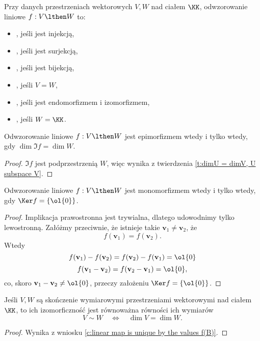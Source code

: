 \begin{definition}
    Przy danych przestrzeniach wektorowych $V, W$ nad ciałem $\KK$, odwzorowanie liniowe $f : V \lthen W$ to:
    \begin{itemize}
        \item {}, jeśli jest injekcją,
        \item {}, jeśli jest surjekcją,
        \item {}, jeśli jest bijekcją,
        \item {}, jeśli $V = W$,
        \item {}, jeśli jest endomorfizmem i izomorfizmem,
        \item {}, jeśli $W = \KK$.
    \end{itemize}
\end{definition}

\begin{theorem}
    Odwzorowanie liniowe $f : V \lthen W$ jest epimorfizmem wtedy i tylko wtedy, gdy $\dim\Im f = \dim W$.
\end{theorem}
\begin{proof}
    $\Im f$ jest podprzestrzenią $W$, więc wynika z twierdzenia \ref{t:dimU = dimV, U subspace V}.
\end{proof}

\begin{theorem}
    Odwzorowanie liniowe $f : V \lthen W$ jest monomorfizmem wtedy i tylko wtedy, gdy $\Ker f = \{\ol{0}\}$.
\end{theorem}
\begin{proof}
    Implikacja prawostronna jest trywialna, dlatego udowodnimy tylko lewostronną. Załóżmy przeciwnie, że istnieje takie $\mathbf{v}_1 \neq \mathbf{v}_2$, że
    \[ f(\mathbf{v}_1) = f(\mathbf{v}_2). \]
    Wtedy
    \[ f(\mathbf{v}_1) - f(\mathbf{v}_2) = f(\mathbf{v}_2) - f(\mathbf{v}_1) = \ol{0} \]
    \[ f(\mathbf{v}_1 - \mathbf{v}_2) = f(\mathbf{v}_2 - \mathbf{v}_1) = \ol{0}, \]
    co, skoro $\mathbf{v}_1 - \mathbf{v}_2 \neq \ol{0}$, przeczy założeniu $\Ker f = \{\ol{0}\}$.
\end{proof}

\begin{theorem}
    Jeśli $V, W$ są skończenie wymiarowymi przestrzeniami wektorowymi nad ciałem $\KK$, to ich izomorficzność jest równoważna równości ich wymiarów
    \[ V \sim W \quad \iff \quad \dim V = \dim W. \]
\end{theorem}
\begin{proof}
    Wynika z wniosku \ref{c:linear map is unique by the values f(B)}.
\end{proof}

